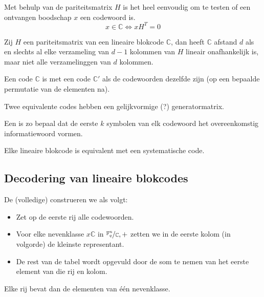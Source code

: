 \documentclass[main.tex]{subfiles}
\begin{document}
\begin{opm}
  Met behulp van de pariteitsmatrix $H$ is het heel eenvoudig om te testen of een ontvangen boodschap $x$ een codewoord is.
  \[ x\in \mathbb{C} \Leftrightarrow xH^{T} = 0 \]
\end{opm}

\begin{st}
  Zij $H$ een pariteitsmatrix van een lineaire blokcode $\mathbb{C}$, dan heeft $\mathbb{C}$ afstand $d$ als en slechts al elke verzameling van $d-1$ kolommen van $H$ lineair onafhankelijk is, maar niet alle verzamelinggen van $d$ kolommen.
\end{st}

\begin{de}
  Een code $\mathbb{C}$ is  met een code $\mathbb{C}'$ als de codewoorden dezelfde zijn (op een bepaalde permutatie van de elementen na).
\end{de}

\begin{opm}
  Twee equivalente codes hebben een gelijkvormige (?) generatormatrix.
\end{opm}

\begin{de}
  Een  is zo bepaal dat de eerste $k$ symbolen van elk codewoord het overeenkomstig informatiewoord vormen.
\end{de}

\begin{st}
  Elke lineaire blokcode is equivalent met een systematische code.
\end{st}

\subsection{Decodering van lineaire blokcodes}

\begin{de}
  De (volledige)  construeren we als volgt:
  \begin{itemize}
  \item Zet op de eerste rij alle codewoorden.
  \item Voor elke nevenklasse $x\mathbb{C}$ in $\nicefrac{\mathbb{F}_{q}^{n}}{\mathbb{C}},+$ zetten we in de eerste kolom (in volgorde) de kleinste representant.
  \item De rest van de tabel wordt opgevuld door de som te nemen van het eerste element van die rij en kolom.
  \end{itemize}
  Elke rij bevat dan de elementen van \'e\'en nevenklasse.
\end{de}
\end{document}
